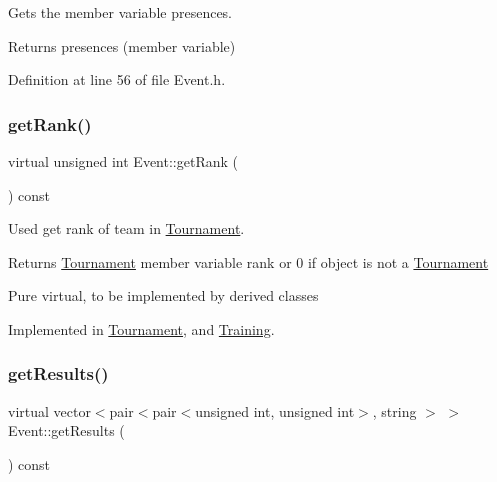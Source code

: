 Gets the member variable presences. 

\begin{DoxyReturn}{Returns}
presences (member variable) 
\end{DoxyReturn}


Definition at line 56 of file Event.\+h.

\hypertarget{class_event_ab267b8e94c78ca51636792d75101acb5}{}\label{class_event_ab267b8e94c78ca51636792d75101acb5} 
\subsubsection{\texorpdfstring{get\+Rank()}{getRank()}}
{\footnotesize\ttfamily virtual unsigned int Event\+::get\+Rank (\begin{DoxyParamCaption}{ }\end{DoxyParamCaption}) const\hspace{0.3cm}{\ttfamily [pure virtual]}}



Used get rank of team in \hyperlink{class_tournament}{Tournament}. 

\begin{DoxyReturn}{Returns}
\hyperlink{class_tournament}{Tournament} member variable rank or 0 if object is not a \hyperlink{class_tournament}{Tournament}
\end{DoxyReturn}
Pure virtual, to be implemented by derived classes 

Implemented in \hyperlink{class_tournament_ae021dc9d9aa7fb8b18bd065bfccc4b7e}{Tournament}, and \hyperlink{class_training_ada723ff1f8340338a99e720a1b472334}{Training}.

\hypertarget{class_event_a9d29f8c725da32b5fbf70ccf7961f02b}{}\label{class_event_a9d29f8c725da32b5fbf70ccf7961f02b} 
\subsubsection{\texorpdfstring{get\+Results()}{getResults()}}
{\footnotesize\ttfamily virtual vector$<$pair$<$pair$<$unsigned int, unsigned int$>$, string $>$ $>$ Event\+::get\+Results (\begin{DoxyParamCaption}{ }\end{DoxyParamCaption}) const\hspace{0.3cm}{\ttfamily [pure virtual]}}



